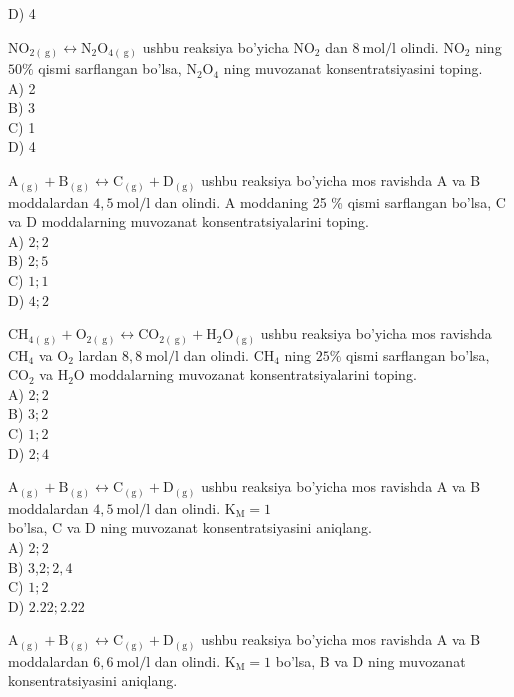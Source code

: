 D) 4
  \item $\mathrm{NO}_{2(\mathrm{~g})} \leftrightarrow \mathrm{N}_{2} \mathrm{O}_{4(\mathrm{~g})}$ ushbu reaksiya bo'yicha $\mathrm{NO}_{2}$ dan $8 \mathrm{~mol} / \mathrm{l}$ olindi. $\mathrm{NO}_{2}$ ning $50 \%$ qismi sarflangan bo'lsa, $\mathrm{N}_{2} \mathrm{O}_{4}$ ning muvozanat konsentratsiyasini toping.\\
A) 2\\
B) 3\\
C) 1\\
D) 4
  \item $\mathrm{A}_{(\mathrm{g})}+\mathrm{B}_{(\mathrm{g})} \leftrightarrow \mathrm{C}_{(\mathrm{g})}+\mathrm{D}_{(\mathrm{g})}$ ushbu reaksiya bo'yicha mos ravishda A va B moddalardan $4,5 \mathrm{~mol} / \mathrm{l}$ dan olindi. A moddaning 25 \% qismi sarflangan bo'lsa, C va D moddalarning muvozanat konsentratsiyalarini toping.\\
A) $2 ; 2$\\
B) $2 ; 5$\\
C) $1 ; 1$\\
D) $4 ; 2$
  \item $\mathrm{CH}_{4(\mathrm{~g})}+\mathrm{O}_{2(\mathrm{~g})} \leftrightarrow \mathrm{CO}_{2(\mathrm{~g})}+\mathrm{H}_{2} \mathrm{O}_{(\mathrm{g})}$ ushbu reaksiya bo'yicha mos ravishda $\mathrm{CH}_{4}$ va $\mathrm{O}_{2}$ lardan $8,8 \mathrm{~mol} / \mathrm{l}$ dan olindi. $\mathrm{CH}_{4}$ ning $25 \%$ qismi sarflangan bo'lsa, $\mathrm{CO}_{2}$ va $\mathrm{H}_{2} \mathrm{O}$ moddalarning muvozanat konsentratsiyalarini toping.\\
A) $2 ; 2$\\
B) $3 ; 2$\\
C) $1 ; 2$\\
D) $2 ; 4$
  \item $\mathrm{A}_{(\mathrm{g})}+\mathrm{B}_{(\mathrm{g})} \leftrightarrow \mathrm{C}_{(\mathrm{g})}+\mathrm{D}_{(\mathrm{g})}$ ushbu reaksiya bo'yicha mos ravishda A va B moddalardan $4,5 \mathrm{~mol} / \mathrm{l}$ dan olindi. $\mathrm{K}_{\mathrm{M}}=1$\\
bo'lsa, C va D ning muvozanat konsentratsiyasini aniqlang.\\
A) $2 ; 2$\\
B) 3,$2 ; 2,4$\\
C) $1 ; 2$\\
D) $2.22 ; 2.22$
  \item $\mathrm{A}_{(\mathrm{g})}+\mathrm{B}_{(\mathrm{g})} \leftrightarrow \mathrm{C}_{(\mathrm{g})}+\mathrm{D}_{(\mathrm{g})}$ ushbu reaksiya bo'yicha mos ravishda A va B moddalardan $6,6 \mathrm{~mol} / \mathrm{l}$ dan olindi. $\mathrm{K}_{\mathrm{M}}=1$ bo'lsa, B va D ning muvozanat konsentratsiyasini aniqlang.\\
